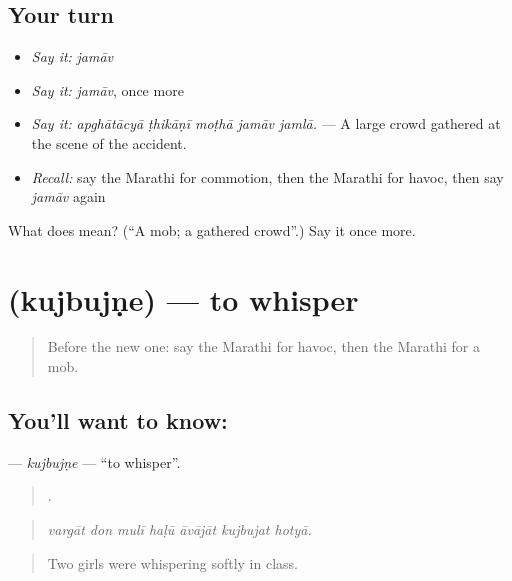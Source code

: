 \subsection*{Your turn}
\begin{itemize}
\raggedright
  \item \emph{Say it:} \emph{jamāv}
  \item \emph{Say it:} \emph{jamāv}, once more
  \item \emph{Say it:} \emph{apghātācyā ṭhikāṇī moṭhā jamāv jamlā.} — A large crowd gathered at the scene of the accident.
  \item \emph{Recall:} say the Marathi for commotion, then the Marathi for havoc, then say \emph{jamāv} again
\end{itemize}

\begin{tcolorbox}[breakable,colback=teal!4,colframe=teal!35!black,title={Before you move on}]
What does  mean? (\textquotedblleft{}A mob; a gathered crowd\textquotedblright{}.) Say it once more.
\end{tcolorbox}
\section[\texorpdfstring{\mr{कुजबुजणे} (kujbujṇe)}{कुजबुजणे (kujbujṇe)}]{ (kujbujṇe) — to whisper}

\label{lesson:MR-C298-kujbujne}



\begin{quote}
Before the new one: say the Marathi for havoc, then the Marathi for a mob.
\end{quote}

\subsection*{You'll want to know: }
\textbf{} — \emph{kujbujṇe} — \textquotedblleft{}to whisper\textquotedblright{}.

\begin{quote}
      .
\end{quote}

\begin{quote}
\emph{vargāt don mulī haḷū āvājāt kujbujat hotyā.}
\end{quote}

\begin{quote}
Two girls were whispering softly in class.
\end{quote}

